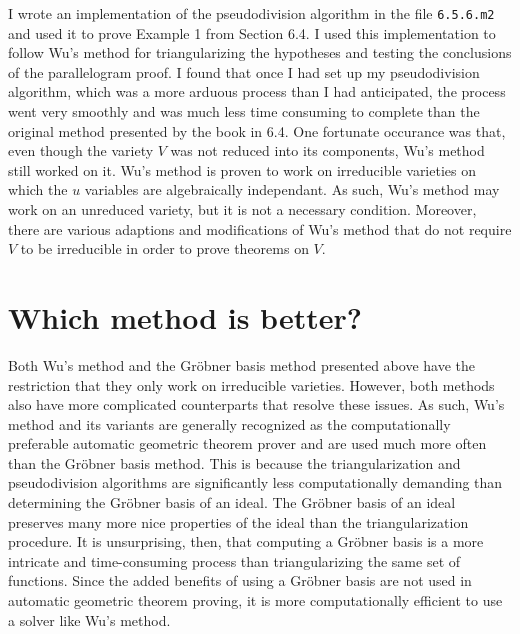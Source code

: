 \documentclass[12pt]{article}
\theoremstyle{plain}
\theoremstyle{definition}
\theoremstyle{remark}
\newcommand{\gro}{Gr\"obner }
\begin{document}
I wrote an implementation of the pseudodivision algorithm in the file \texttt{6.5.6.m2} and used it to prove Example 1 from Section 6.4. 
I used this implementation to follow Wu's method for triangularizing the hypotheses and testing the conclusions of the parallelogram proof.
I found that once I had set up my pseudodivision algorithm, which was a more arduous process than I had anticipated, 
the process went very smoothly and was much less time consuming to complete than the original method presented by the book in 6.4.
One fortunate occurance was that, even though the variety $V$ was not reduced into its components, Wu's method still worked on it.
Wu's method is proven to work on irreducible varieties on which the $u$ variables are algebraically independant.
As such, Wu's method may work on an unreduced variety, but it is not a necessary condition.
Moreover, there are various adaptions and modifications of Wu's method that do not require $V$ to be irreducible in order to prove theorems on $V$.

\section{Which method is better?}
Both Wu's method and the \gro basis method presented above have the restriction that they only work on irreducible varieties. 
However, both methods also have more complicated counterparts that resolve these issues.
As such, Wu's method and its variants are generally recognized as the computationally preferable automatic geometric theorem prover and are used much more often than the Gröbner basis method.
This is because the triangularization and pseudodivision algorithms are significantly less computationally demanding than determining the Gröbner basis of an ideal.
The \gro basis of an ideal preserves many more nice properties of the ideal than the triangularization procedure. 
It is unsurprising, then, that computing a \gro basis is a more intricate and time-consuming process than triangularizing the same set of functions.
Since the added benefits of using a \gro basis are not used in automatic geometric theorem proving, it is more computationally efficient to use a solver like Wu's method.
\end{document}
